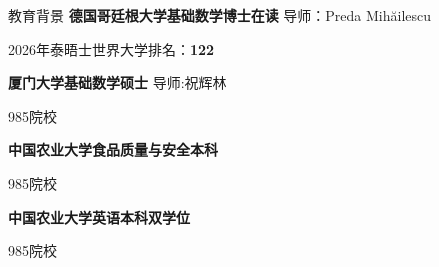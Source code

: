 \begin{rubric}{教育背景}
\entry*[2021.09 -- \quad 至今]%
	\textbf{德国哥廷根大学\quad 基础数学博士在读} \hfill 导师：Preda Mih\u{a}ilescu
    
   2026年泰晤士世界大学排名：\textbf{122} \par
%
\entry*[2018.09 -- 2021.06]%
	\textbf{厦门大学\qquad\qquad 基础数学硕士} \hfill 导师:祝辉林
    
    985院校  \par
% 
\entry*[2014.09 -- 2018.06]%
	\textbf{中国农业大学\qquad 食品质量与安全本科} 
    
    985院校  \par

\entry*[2015.09 -- 2018.06]%
	\textbf{中国农业大学\qquad 英语本科双学位} 
    
    985院校 \par
\end{rubric}


